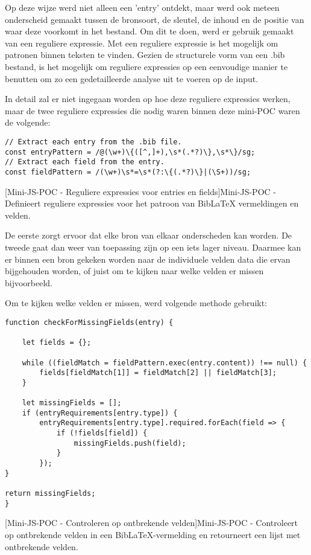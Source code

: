 Op deze wijze werd niet alleen een 'entry' ontdekt, maar werd ook meteen onderscheid gemaakt tussen de bronsoort, de sleutel, de inhoud en de positie van waar deze voorkomt in het bestand. Om dit te doen, werd er gebruik gemaakt van een reguliere expressie. Met een reguliere expressie is het mogelijk om patronen binnen teksten te vinden. Gezien de structurele vorm van een .bib bestand, is het mogelijk om reguliere expressies op een eenvoudige manier te benutten om zo een gedetailleerde analyse uit te voeren op de input.

In detail zal er niet ingegaan worden op hoe deze reguliere expressies werken, maar de twee reguliere expressies die nodig waren binnen deze mini-\acrshort{POC} waren de volgende:
\begin{verbatim}
// Extract each entry from the .bib file.
const entryPattern = /@(\w+)\{([^,]+),\s*(.*?)\},\s*\}/sg;
// Extract each field from the entry.
const fieldPattern = /(\w+)\s*=\s*(?:\{(.*?)\}|(\S+))/sg;
\end{verbatim}
[Mini-\acrshort{JS}-\acrshort{POC} - Reguliere expressies voor entries en fields]{Mini-\acrshort{JS}-\acrshort{POC} - Definieert reguliere expressies voor het patroon van BibLaTeX vermeldingen en velden. \label{lst:minipocjs_regex_patterns}}

De eerste zorgt ervoor dat elke bron van elkaar onderscheden kan worden. De tweede gaat dan weer van toepassing zijn op een iets lager niveau. Daarmee kan er binnen een bron gekeken worden naar de individuele velden data die ervan bijgehouden worden, of juist om te kijken naar welke velden er missen bijvoorbeeld.

Om te kijken welke velden er missen, werd volgende methode gebruikt:

\begin{verbatim}
function checkForMissingFields(entry) {

    let fields = {};

    while ((fieldMatch = fieldPattern.exec(entry.content)) !== null) {
        fields[fieldMatch[1]] = fieldMatch[2] || fieldMatch[3];
    }

    let missingFields = [];
    if (entryRequirements[entry.type]) {
        entryRequirements[entry.type].required.forEach(field => {
            if (!fields[field]) {
                missingFields.push(field);
            }
        });
}

return missingFields;
}
\end{verbatim}
[Mini-\acrshort{JS}-\acrshort{POC} - Controleren op ontbrekende velden]{Mini-\acrshort{JS}-\acrshort{POC} - Controleert op ontbrekende velden in een BibLaTeX-vermelding en retourneert een lijst met ontbrekende velden. \label{lst:minipocjs_check_missing_fields}}

